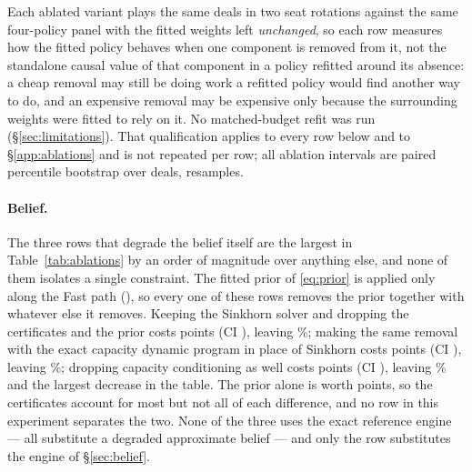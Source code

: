 Each ablated variant plays the same \numAblDeals{} deals in two seat rotations
against the same four-policy panel with the fitted weights left \emph{unchanged},
so each row measures how the fitted policy behaves when one component is removed
from it, not the standalone causal value of that component in a policy refitted
around its absence: a cheap removal may still be doing work a refitted policy
would find another way to do, and an expensive removal may be expensive only
because the surrounding weights were fitted to rely on it. No matched-budget
refit was run (\S\ref{sec:limitations}). That qualification applies to every row
below and to \S\ref{app:ablations} and is not repeated per row; all ablation
intervals are paired percentile bootstrap over deals, \numBootstrapDraws{}
resamples.

\begin{table}[!htbp]
\centering
\caption{Frozen-policy ablations (E5). Population: \numAblDeals{} deals in two
seat rotations against the four-policy panel \{\vthree{}, turn-starvation
lockout, posterior detective, \vtwo{}\}, \numAblGames{} games per opponent, seed
$606060$, full rules dialect. Fitted weights are frozen at the shipping values in
every row; only the named component changes. ``Full $-$ ablated'' is the
reference win rate \numAblRef\% minus the row's, so positive means removal hurt.
Intervals: paired percentile bootstrap over deals. The three belief rows at
$21$--$29\%$ substitute weaker approximate beliefs, not the exact reference
engine; only the \vblock{} row uses that. The two policy-prior rows carry
identical figures by construction rather than by coincidence, because the Fast
belief is already the default (\S\ref{app:ablations}).}
\label{tab:ablations}
\footnotesize

\end{table}

\paragraph{Belief.}
The three rows that degrade the belief itself are the largest in
Table~\ref{tab:ablations} by an order of magnitude over anything else, and none
of them isolates a single constraint. The fitted prior of \eqref{eq:prior} is
applied only along the Fast path (), so every one
of these rows removes the prior together with whatever else it removes. Keeping
the Sinkhorn solver and dropping the certificates and the prior costs
\numAblSinkhorn{} points (CI \numAblSinkhornCI{}), leaving \numAblSinkhornAbs\%;
making the same removal with the exact capacity dynamic program in place of
Sinkhorn costs \numAblCFive{} points (CI \numAblCFiveCI{}), leaving
\numAblCFiveAbs\%; dropping capacity conditioning as well costs \numAblCFour{}
points (CI \numAblCFourCI{}), leaving \numAblCFourAbs\% and the largest decrease
in the table. The prior alone is worth \numAblPrior{} points, so the certificates
account for most but not all of each difference, and no row in this experiment
separates the two. None of the three uses the exact reference engine --- all
substitute a degraded approximate belief --- and only the \vblock{} row
substitutes the engine of \S\ref{sec:belief}.

